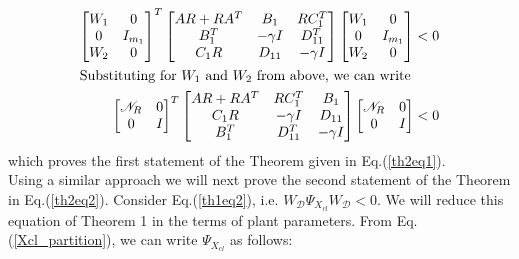 \documentclass[a4paper,12pt]{article}
\begin{document}
	\begin{align}
	\begin{bmatrix}
	W_{1} & 0 \\ 0 & I_{m_{1}} \\ W_{2} & 0 
	\end{bmatrix}^{T}
	\begin{bmatrix}
	AR + RA^{T} & B_{1} & RC_{1}^{T} \\
	B_{1}^{T} & -\gamma I & D_{11}^{T} \\
	C_{1}R & D_{11} & -\gamma I
	\end{bmatrix}
	\begin{bmatrix}
	W_{1} & 0 \\ 0 & I_{m_{1}} \\ W_{2} & 0 
	\end{bmatrix} &< 0 \\
	\intertext{Substituting for $W_{1}$ and $W_{2}$ from above, we can write}
	\begin{bmatrix}
	\mathscr{N}_{R} & 0 \\
	0 & I
	\end{bmatrix}^{T}
	\begin{bmatrix}
	AR+RA^{T} & RC_{1}^{T} & B_{1} \\
	C_{1}R & -\gamma I & D_{11} \\
	B_{1}^{T} & D_{11}^{T} & -\gamma I
	\end{bmatrix}
	\begin{bmatrix}
	\mathscr{N}_{R} & 0 \\ 
	0 & I
	\end{bmatrix} &<0 
	\end{align}
	which proves the first statement of the Theorem given in Eq.(\ref{th2eq1}). \\Using a similar approach we will next prove the second statement of the Theorem in Eq.(\ref{th2eq2}). Consider Eq.(\ref{th1eq2}), i.e. $W_{\mathscr{D}}\Psi_{X_{cl}}W_{\mathscr{D}} < 0 $. We will reduce this equation of Theorem 1 in the terms of plant parameters. From Eq.(\ref{Xcl_partition}), we can write $\Psi_{X_{cl}}$ as follows:
\end{document}
